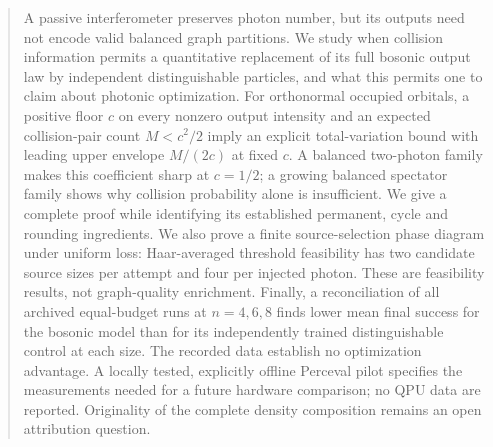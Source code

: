 
\maketitle
\begin{abstract}
A passive interferometer preserves photon number, but its outputs need not encode valid balanced graph partitions. We study when collision information permits a quantitative replacement of its full bosonic output law by independent distinguishable particles, and what this permits one to claim about photonic optimization. For orthonormal occupied orbitals, a positive floor $c$ on every nonzero output intensity and an expected collision-pair count $M<c^2/2$ imply an explicit total-variation bound with leading upper envelope $M/(2c)$ at fixed $c$. A balanced two-photon family makes this coefficient sharp at $c=1/2$; a growing balanced spectator family shows why collision probability alone is insufficient. We give a complete proof while identifying its established permanent, cycle and rounding ingredients. We also prove a finite source-selection phase diagram under uniform loss: Haar-averaged threshold feasibility has two candidate source sizes per attempt and four per injected photon. These are feasibility results, not graph-quality enrichment. Finally, a reconciliation of all \ErunCount{} archived equal-budget runs at $n=4,6,8$ finds lower mean final success for the bosonic model than for its independently trained distinguishable control at each size. The recorded data establish no optimization advantage. A locally tested, explicitly offline Perceval pilot specifies the measurements needed for a future hardware comparison; no QPU data are reported. Originality of the complete density composition remains an open attribution question.
\end{abstract}
